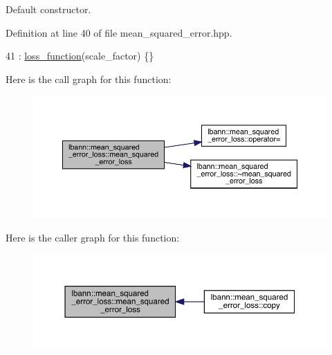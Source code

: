 Default constructor. 

Definition at line 40 of file mean\+\_\+squared\+\_\+error.\+hpp.


\begin{DoxyCode}
41     : \hyperlink{classlbann_1_1loss__function_a0c5745e661c59e3e5496888d233c07cf}{loss\_function}(scale\_factor) \{\}
\end{DoxyCode}
Here is the call graph for this function\+:\nopagebreak
\begin{figure}[H]
\begin{center}
\leavevmode
\includegraphics[width=350pt]{classlbann_1_1mean__squared__error__loss_a97883c4e1491dcf28f21179b62090c48_cgraph}
\end{center}
\end{figure}
Here is the caller graph for this function\+:\nopagebreak
\begin{figure}[H]
\begin{center}
\leavevmode
\includegraphics[width=350pt]{classlbann_1_1mean__squared__error__loss_a97883c4e1491dcf28f21179b62090c48_icgraph}
\end{center}
\end{figure}
\mbox{\label{classlbann_1_1mean__squared__error__loss_a142976fada7414ea93a1f7fd873624e3}} 
